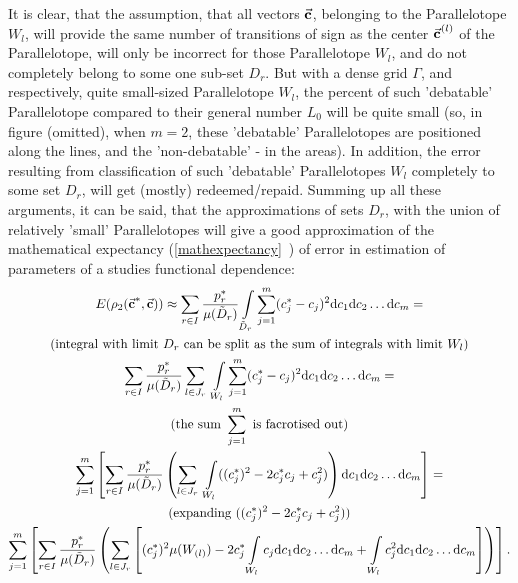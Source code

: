 It is clear, that the assumption, that all vectors $\vec{\textbf{c}}$, belonging to the Parallelotope $W_{l}$, will provide the same number of transitions of sign as the center $\vec{\textbf{c}}^{(l)}$ of the Parallelotope, will only be incorrect for those Parallelotope $W_{l}$, and do not completely belong to some one sub-set $D_{r}$. But with a dense grid $\Gamma$, and respectively, quite small-sized Parallelotope $W_{l}$, the percent of such 'debatable' Parallelotope compared to their general number $L_{0}$ will be quite small (so, in figure (omitted), when $m=2$, these 'debatable' Parallelotopes are positioned along the lines, and the 'non-debatable' - in the areas). In addition, the error resulting from classification of such 'debatable' Parallelotopes $W_{l}$ completely to some set $D_{r}$, will get (mostly) redeemed/repaid. Summing up all these arguments, it can be said, that the approximations of sets $D_{r}$, with the union of relatively 'small' Parallelotopes will give a good  approximation of the mathematical expectancy (\vref{mathexpectancy}~) of error in estimation of parameters of a studies functional dependence:
\begin{gather}
\nonumber
E(\rho_{2}(\vecc^{*},\vecc)) \approx \sum\limits_{r \in I} \frac{p_{r}^{*}}{\mu(\tilde{D}_{r})} \int\limits_{\tilde{D}_{r}} \sum\limits_{j=1}^{m}(c_{j}^{*}-c_{j})^{2}\mathrm{d}c_{1}\mathrm{d}c_{2}\dots \mathrm{d}c_{m} = \\
\nonumber 
\text{(integral with limit } D_{r} \text{ can be split as the sum of integrals with limit } W_{l} \text{)}\\
\sum\limits_{r \in I} \frac{p_{r}^{*}}{\mu(\tilde{D}_{r})} \sum\limits_{l \in J_{r}} \  \int\limits_{W_{l}} \sum\limits_{j=1}^{m}(c_{j}^{*}-c_{j})^{2}\mathrm{d}c_{1}\mathrm{d}c_{2}\dots \mathrm{d}c_{m} = \\
\nonumber
\text{(the sum } \sum_{j=1}^{m} \text{ is facrotised out)} \\
\nonumber
\sum\limits_{j=1}^{m}  \left[ \sum\limits_{r \in I} \frac{p_{r}^{*}}{\mu(\tilde{D}_{r})} \left( \sum\limits_{l \in J_{r}} \ \int\limits_{W_{l}} ((c_{j}^{*})^{2}-2c_{j}^{*}c_{j}+c_{j}^{2}) \right) \mathrm{d}c_{1}\mathrm{d}c_{2}\dots \mathrm{d}c_{m} \right] = \\
\nonumber
\text{(expanding } ((c_{j}^{*})^{2}-2c_{j}^{*}c_{j}+c_{j}^{2}) \text{)}\\
\sum\limits_{j=1}^{m}  \left[ \sum\limits_{r \in I} \frac{p_{r}^{*}}{\mu(\tilde{D}_{r})} \left( \sum\limits_{l \in J_{r}} \left[ (c_{j}^{*})^{2} \mu(W_{(l)}) - 2c_{j}^{*} \int\limits_{W_{l}} c_{j} \mathrm{d}c_{1}\mathrm{d}c_{2}\dots \mathrm{d}c_{m} + \int\limits_{W_{l}} c_{j}^{2} \mathrm{d}c_{1}\mathrm{d}c_{2}\dots \mathrm{d}c_{m} \right] \right) \right]. \label{eq-simplification-chain}
\end{gather}
